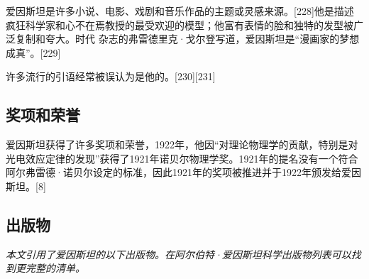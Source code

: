 爱因斯坦是许多小说、电影、戏剧和音乐作品的主题或灵感来源。[228]他是描述疯狂科学家和心不在焉教授的最受欢迎的模型；他富有表情的脸和独特的发型被广泛复制和夸大。时代 杂志的弗雷德里克·戈尔登写道，爱因斯坦是“漫画家的梦想成真”。[229]

许多流行的引语经常被误认为是他的。[230][231]

\subsection{奖项和荣誉}
爱因斯坦获得了许多奖项和荣誉，1922年，他因“对理论物理学的贡献，特别是对光电效应定律的发现”获得了1921年诺贝尔物理学奖。1921年的提名没有一个符合阿尔弗雷德·诺贝尔设定的标准，因此1921年的奖项被推进并于1922年颁发给爱因斯坦。[8]

\subsection{出版物}
\textsl{本文引用了爱因斯坦的以下出版物。在阿尔伯特·爱因斯坦科学出版物列表可以找到更完整的清单。}
